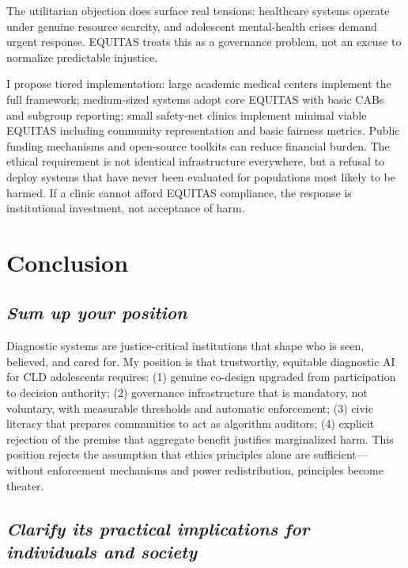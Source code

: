 \documentclass[12pt,a4paper]{article}
\begin{document}
The utilitarian objection does surface real tensions: healthcare systems operate under genuine resource scarcity, and adolescent mental-health crises demand urgent response. EQUITAS treats this as a governance problem, not an excuse to normalize predictable injustice.

I propose tiered implementation: large academic medical centers implement the full framework; medium-sized systems adopt core EQUITAS with basic CABs and subgroup reporting; small safety-net clinics implement minimal viable EQUITAS including community representation and basic fairness metrics. Public funding mechanisms and open-source toolkits can reduce financial burden. The ethical requirement is not identical infrastructure everywhere, but a refusal to deploy systems that have never been evaluated for populations most likely to be harmed. If a clinic cannot afford EQUITAS compliance, the response is institutional investment, not acceptance of harm.

\section{Conclusion}

\subsection*{\textit{Sum up your position}}

Diagnostic systems are justice-critical institutions that shape who is seen, believed, and cared for. My position is that trustworthy, equitable diagnostic AI for CLD adolescents requires: (1) genuine co-design upgraded from participation to decision authority; (2) governance infrastructure that is mandatory, not voluntary, with measurable thresholds and automatic enforcement; (3) civic literacy that prepares communities to act as algorithm auditors; (4) explicit rejection of the premise that aggregate benefit justifies marginalized harm. This position rejects the assumption that ethics principles alone are sufficient—without enforcement mechanisms and power redistribution, principles become theater.

\subsection*{\textit{Clarify its practical implications for individuals and society}}
\end{document}
